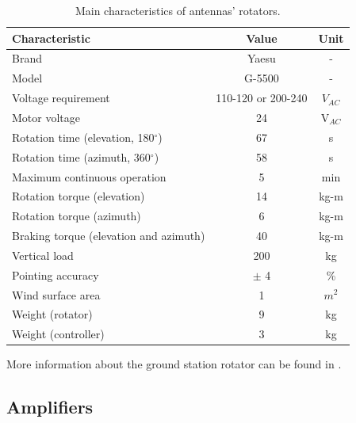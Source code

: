 \begin{table}[ht]
    \centering
    \begin{tabular}{lcc}
        \toprule[1.5pt]
        \textbf{Characteristic}                     & \textbf{Value}        & \textbf{Unit} \\
        \midrule
        Brand                                       & Yaesu                 & - \\
        Model                                       & G-5500                & - \\
        Voltage requirement                         & 110-120 or 200-240    & $V_{AC}$ \\
        Motor voltage                               & 24                    & V$_{AC}$ \\
        Rotation time (elevation, 180$^{\circ}$)    & 67                    & s \\
        Rotation time (azimuth, 360$^{\circ}$)      & 58                    & s \\
        Maximum continuous operation                & 5                     & min \\
        Rotation torque (elevation)                 & 14                    & kg-m \\
        Rotation torque (azimuth)                   & 6                     & kg-m \\
        Braking torque (elevation and azimuth)      & 40                    & kg-m \\
        Vertical load                               & 200                   & kg \\
        Pointing accuracy                           & $\pm$ 4               & \% \\
        Wind surface area                           & 1                     & $m^{2}$ \\
        Weight (rotator)                            & 9                     & kg \\
        Weight (controller)                         & 3                     & kg \\
        \bottomrule[1.5pt]
    \end{tabular}
    \caption{Main characteristics of antennas' rotators.}
    \label{tab:grs-rotor}
\end{table}

More information about the ground station rotator can be found in \cite{g5500}.

\subsection{Amplifiers}


